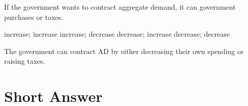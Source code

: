 \documentclass[addpoints,11pt]{exam}
\theoremstyle{definition}
\newcommand{\blank}[0]{\underline{\hspace{3cm}}}
\begin{document}
\begin{questions}
\item If the government wants to contract aggregate demand, it can \blank government purchases or \blank taxes.

\begin{choices}
	\choice increase; increase
	\choice increase; decrease
	\CorrectChoice decrease; increase
	\choice decrease; decrease 
\end{choices}

\begin{solution}
	The government can contract AD by either decreasing their own spending or raising taxes.
\end{solution}

\end{questions}

\newpage

\section*{Short Answer}
\end{document}
